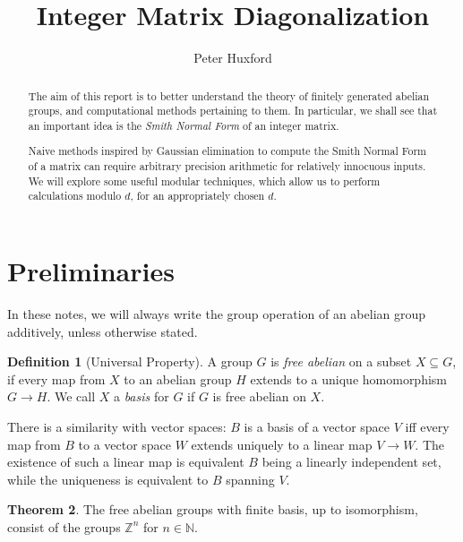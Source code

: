 \documentclass[12pt,a4paper]{article}
\title{Integer Matrix Diagonalization}
\author{Peter Huxford}
\newcommand{\N}{\mathbb{N}}
\newcommand{\Z}{\mathbb{Z}}
\theoremstyle{definition}
\newtheorem{theorem}{Theorem}[section]
\newtheorem{definition}[theorem]{Definition}
\begin{document}
\maketitle

\begin{abstract}
  The aim of this report is to better understand the theory of finitely generated abelian groups, and computational methods pertaining to them. In particular, we shall see that an important idea is the \emph{Smith Normal Form} of an integer matrix.

Naive methods inspired by Gaussian elimination to compute the Smith Normal Form of a matrix can require arbitrary precision arithmetic for relatively innocuous inputs. We will explore some useful modular techniques, which allow us to perform calculations modulo $d$, for an appropriately chosen $d$.
\end{abstract}

\section{Preliminaries}

In these notes, we will always write the group operation of an abelian group additively, unless otherwise stated. 

\begin{definition}[Universal Property]
  A group $G$ is \emph{free abelian} on a subset $X\subseteq G$, if every map from $X$ to an abelian group $H$ extends to a unique homomorphism $G\to H$. We call $X$ a \emph{basis} for $G$ if $G$ is free abelian on $X$.
\end{definition}

There is a similarity with vector spaces: $B$ is a basis of a vector space $V$ iff every map from $B$ to a vector space $W$ extends uniquely to a linear map $V\to W$. The existence of such a linear map is equivalent $B$ being a linearly independent set, while the uniqueness is equivalent to $B$ spanning $V$.


\begin{theorem}
  The free abelian groups with finite basis, up to isomorphism, consist of the groups $\Z^n$ for $n\in\N$.
\end{theorem}
\end{document}
